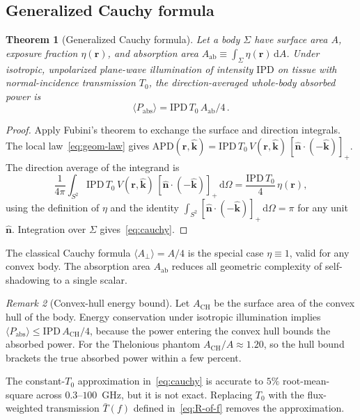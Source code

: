 \documentclass[journal,twocolumn,10pt]{IEEEtran}
\theoremstyle{plain}
\newtheorem{theorem}{Theorem}
\theoremstyle{remark}
\newtheorem{remark}[theorem]{Remark}
\newcommand{\khat}{\hat{\bm{k}}}
\newcommand{\nhat}{\hat{\bm{n}}}
\newcommand{\rr}{\mathbf{r}}
\newcommand{\IPD}{\mathrm{IPD}}
\newcommand{\APD}{\mathrm{APD}}
\newcommand{\Aab}{A_{\mathrm{ab}}}
\newcommand{\Aperp}{A_\perp}
\newcommand{\Tbar}{\bar{T}}
\newcommand{\diff}{\mathrm{d}}
\newcommand{\pospart}[1]{\left[#1\right]_{+}}
\newcommand{\Vis}{V}
\begin{document}
\subsection{Generalized Cauchy formula}\label{subsec:cauchy-thm}

\begin{theorem}[Generalized Cauchy formula]\label{thm:cauchy}
Let a body $\Sigma$ have surface area $A$, exposure fraction
$\eta(\rr)$, and absorption area
$\Aab \equiv \int_\Sigma \eta(\rr)\,\diff A$. Under isotropic,
unpolarized plane-wave illumination of intensity $\IPD$ on tissue
with normal-incidence transmission $T_0$, the direction-averaged
whole-body absorbed power is
\begin{equation}\label{eq:cauchy}
  \langle P_{\mathrm{abs}} \rangle = \IPD\,T_0\,\Aab/4\, .
\end{equation}
\end{theorem}

\begin{proof}
Apply Fubini's theorem to exchange the surface and direction
integrals. The local law~\eqref{eq:geom-law} gives
$\APD(\rr,\khat) = \IPD\,T_0\,\Vis(\rr,\khat)\,
\pospart{\nhat\cdot(-\khat)}$. The direction average of the integrand
is
\[
  \frac{1}{4\pi}\int_{S^2}
  \IPD\,T_0\,\Vis(\rr,\khat)\,\pospart{\nhat\cdot(-\khat)}\,
  \diff\Omega
  = \frac{\IPD\,T_0}{4}\,\eta(\rr),
\]
using the definition of $\eta$ and the identity $\int_{S^2}
\pospart{\nhat\cdot(-\khat)}\,\diff\Omega = \pi$ for any unit
$\nhat$. Integration over $\Sigma$ gives~\eqref{eq:cauchy}.
\end{proof}

The classical Cauchy formula $\langle\Aperp\rangle = A/4$ is the
special case $\eta \equiv 1$, valid for any convex body. The
absorption area $\Aab$ reduces all geometric complexity of
self-shadowing to a single scalar.

\begin{remark}[Convex-hull energy bound]\label{rem:hull}
Let $A_{\mathrm{CH}}$ be the surface area of the convex hull of the
body. Energy conservation under isotropic illumination implies
$\langle P_{\mathrm{abs}} \rangle \le \IPD\,A_{\mathrm{CH}}/4$,
because the power entering the convex hull bounds the absorbed power.
For the Thelonious phantom $A_{\mathrm{CH}}/A \approx 1.20$, so the
hull bound brackets the true absorbed power within a few percent.
\end{remark}

The constant-$T_0$ approximation in~\eqref{eq:cauchy} is accurate to
$5\%$ root-mean-square across $0.3$--$100$~GHz, but it is not
exact. Replacing $T_0$ with the flux-weighted transmission $\Tbar(f)$
defined in~\eqref{eq:R-of-f} removes the approximation.
\end{document}
